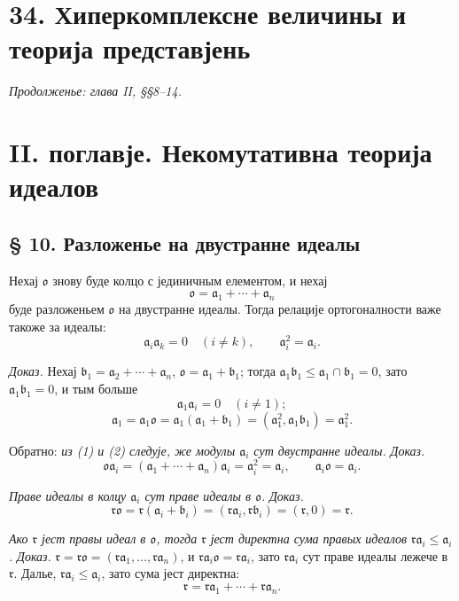 ﻿\documentclass[11pt]{article}
\providecommand{\ma}{\mathfrak{a}}
\providecommand{\mb}{\mathfrak{b}}
\providecommand{\mo}{\mathfrak{o}}
\providecommand{\mr}{\mathfrak{r}}
\begin{document}
\section*{34. Хиперкомплексне величины и теорија представјень}
\emph{Продолженье: глава II, §§8--14.}

\section*{II. поглавје. Некомутативна теорија идеалов}

\subsection*{§ 10. Разложенье на двустранне идеалы}

Нехај $\mo$ знову буде колцо с јединичным елементом, и нехај
\begin{equation}
        \mo=\ma_1+\cdots+\ma_n                                  \tag{1}
\end{equation}
буде разложеньем $\mo$ на двустранне идеалы. Тогда релације ортогоналности важе такоже за идеалы:
\begin{equation}
        \ma_i\ma_k=0\quad(i\ne k),
        \qquad
        \ma_i^2=\ma_i.                                             \tag{2}
\end{equation}

\emph{Доказ.} Нехај $\mb_1=\ma_2+\cdots+\ma_n$, $\mo=\ma_1+\mb_1$; тогда $\ma_1\mb_1\leq \ma_1\cap\mb_1=0$, зато $\ma_1\mb_1=0$, и тым больше
\[
        \ma_1\ma_i=0\quad(i\ne1);
\]
\[
        \ma_1=\ma_1\mo=\ma_1(\ma_1+\mb_1)=(\ma_1^2,\ma_1\mb_1)=\ma_1^2.
\]

Обратно: \emph{из (1) и (2) следује, же модулы $\ma_i$ сут двустранне идеалы.}
\emph{Доказ.}
\[
        \mo\ma_i=(\ma_1+\cdots+\ma_n)\ma_i=\ma_i^2=\ma_i,
        \qquad
        \ma_i\mo=\ma_i.
\]

\emph{Праве идеалы в колцу $\ma_i$ сут праве идеалы в $\mo$.}
\emph{Доказ.}
\[
        \mr\mo=\mr(\ma_i+\mb_i)=(\mr\ma_i,\mr\mb_i)=(\mr,0)=\mr.
\]

\emph{Ако $\mr$ јест правы идеал в $\mo$, тогда $\mr$ јест директна сума правых идеалов $\mr\ma_i\leq\ma_i$.}
\emph{Доказ.} $\mr=\mr\mo=(\mr\ma_1,\ldots,\mr\ma_n)$, и $\mr\ma_i\mo=\mr\ma_i$, зато $\mr\ma_i$ сут праве идеалы лежече в $\mr$. Далье, $\mr\ma_i\leq\ma_i$, зато сума јест директна:
\[
        \mr=\mr\ma_1+\cdots+\mr\ma_n.
\]
\end{document}
